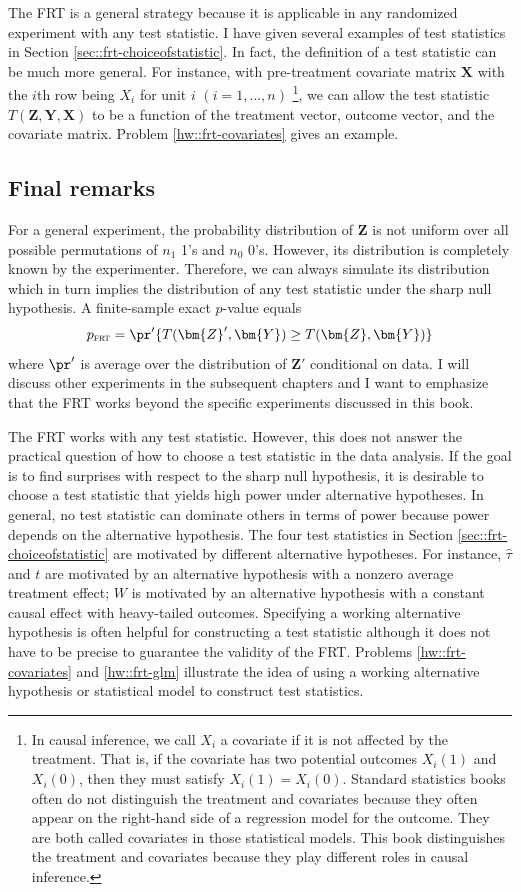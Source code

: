 The FRT is a general strategy because it is applicable in any randomized experiment with any test statistic. 
I have given several examples of test statistics in Section \ref{sec::frt-choiceofstatistic}. In fact, the definition of a test statistic can be much more general. For instance, with pre-treatment covariate matrix $\bm{X}$ with the $i$th row being $X_i$ for unit $i$ $(i = 1, \ldots, n)$ \footnote{In causal inference, we call $X_i$ a covariate if it is not affected by the treatment. That is, if the covariate has two potential outcomes $X_i(1)$ and $X_i(0)$, then they must satisfy $X_i(1) = X_i(0)$. Standard statistics books often do not distinguish the treatment and covariates because they often appear on the right-hand side of a regression model for the outcome. They are both called covariates in those statistical models. This book distinguishes the treatment and covariates because they play different roles in causal inference. }, we can allow the test statistic $T(\bm{Z}, \bm{Y}, \bm{X})$ to be a function of the treatment vector, outcome vector, and the covariate matrix.  Problem \ref{hw::frt-covariates} gives an example. 



\subsection{Final remarks}
For a general experiment, the probability distribution of $\bm{Z}$ is not uniform over all possible permutations of $n_1$ 1's and $n_0$ 0's. However, its distribution is completely known by the experimenter. Therefore, we can always simulate its distribution which in turn implies the distribution of any test statistic under the sharp null hypothesis. A finite-sample exact $p$-value equals 
$$
p_\textsc{frt} = \pr'\{  T(\bm{Z}', \bm{Y}) \geq T(\bm{Z}, \bm{Y}) \}
$$ 
where $\pr'$ is average over the distribution of $\bm{Z}'$ conditional on data. I will discuss other experiments in the subsequent chapters and I want to emphasize that the FRT works beyond the specific experiments discussed in this book. 

 
The FRT works with any test statistic. However, this does not answer the practical question of how to choose a test statistic in the data analysis. If the goal is to find surprises with respect to the sharp null hypothesis, it is desirable to choose a test statistic that yields high power under alternative hypotheses. In general, no test statistic can dominate others in terms of power because power depends on the alternative hypothesis. The four test statistics in Section \ref{sec::frt-choiceofstatistic} are motivated by different alternative hypotheses. For instance, $\hat{\tau}$ and $t$ are motivated by an alternative hypothesis with a nonzero average treatment effect; $W$ is motivated by an alternative hypothesis with a constant causal effect with heavy-tailed outcomes. Specifying a working alternative hypothesis is often helpful for constructing a test statistic although it does not have to be precise to guarantee the validity of the FRT. Problems \ref{hw::frt-covariates} and \ref{hw::frt-glm} illustrate the idea of using a working alternative hypothesis or statistical model to construct test statistics. 
 



